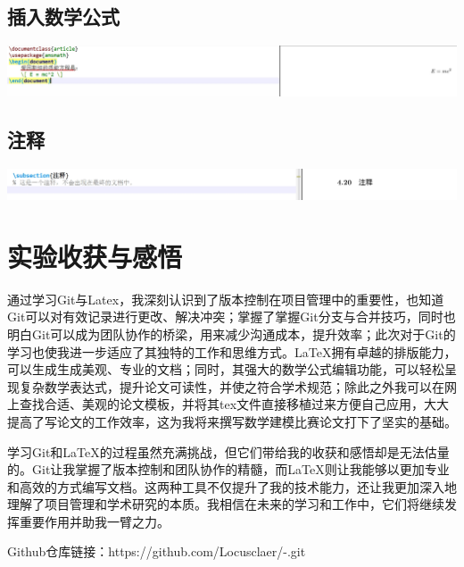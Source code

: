 \documentclass[UTF8,a4paper]{ctexart}
\begin{document}
\begin{sloppypar}
	\subsection{插入数学公式}
	
	\includegraphics[width = 16cm]{29}	
	
	\subsection{注释}
	\includegraphics[width = 16cm]{30}	
	
	\section{实验收获与感悟}
	通过学习Git与Latex，我深刻认识到了版本控制在项目管理中的重要性，也知道Git可以对有效记录进行更改、解决冲突；掌握了掌握Git分支与合并技巧，同时也明白Git可以成为团队协作的桥梁，用来减少沟通成本，提升效率；此次对于Git的学习也使我进一步适应了其独特的工作和思维方式。LaTeX拥有卓越的排版能力，可以生成生成美观、专业的文档；同时，其强大的数学公式编辑功能，可以轻松呈现复杂数学表达式，提升论文可读性，并使之符合学术规范；除此之外我可以在网上查找合适、美观的论文模板，并将其tex文件直接移植过来方便自己应用，大大提高了写论文的工作效率，这为我将来撰写数学建模比赛论文打下了坚实的基础。
	
	学习Git和LaTeX的过程虽然充满挑战，但它们带给我的收获和感悟却是无法估量的。Git让我掌握了版本控制和团队协作的精髓，而LaTeX则让我能够以更加专业和高效的方式编写文档。这两种工具不仅提升了我的技术能力，还让我更加深入地理解了项目管理和学术研究的本质。我相信在未来的学习和工作中，它们将继续发挥重要作用并助我一臂之力。
	
	Github仓库链接：https://github.com/Locusclaer/-.git
	
\end{sloppypar}
\end{document}
